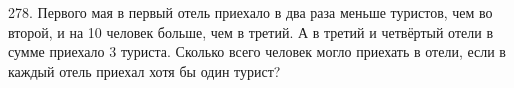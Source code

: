 278. Первого мая в первый отель приехало в два раза меньше туристов, чем во второй, и на 10 человек больше, чем в третий. А в третий и четвёртый отели в сумме приехало 3 туриста. Сколько всего человек могло приехать в отели, если в каждый отель приехал хотя бы один турист?\\
